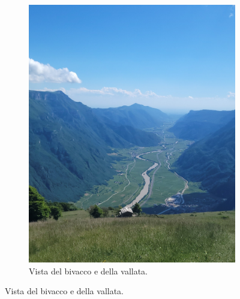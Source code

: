 \documentclass{article}
\begin{document}
\begin{figure}[htbp!]
\begin{subfigure}{0.45\textwidth}
        \includegraphics[width=\linewidth]{images/foto_bivaccoEvallata.jpg}
        \caption{Vista del bivacco e della vallata.}
        \label{fig:foto2}
    \end{subfigure}
    
    \vspace{2em} 
    

\end{figure}
\end{document}
